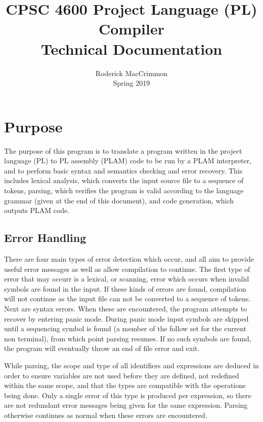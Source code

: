 \documentclass{article}
\begin{document}
\title{CPSC 4600 Project Language (PL) Compiler \\ \LARGE Technical Documentation}
\author{Roderick MacCrimmon \\ Spring 2019}
\date{}
\maketitle

\section{Purpose}

The purpose of this program is to translate a program written in the project language (PL) to PL assembly (PLAM) code to be run by a PLAM interpreter, and to perform basic syntax and semantics checking and error recovery. This includes lexical analysis, which converts the input source file to a sequence of tokens, parsing, which verifies the program is valid according to the language grammar (given at the end of this document), and code generation, which outputs PLAM code. 

\subsection{Error Handling}

There are four main types of error detection which occur, and all aim to provide useful error messages as well as allow compilation to continue. The first type of error that may occurr is a lexical, or scanning, error which occurs when invalid symbols are found in the input. If these kinds of errors are found, compilation will not continue as the input file can not be converted to a sequence of tokens. Next are syntax errors. When these are encountered, the program attempts to recover by entering panic mode. During panic mode input symbols are skipped until a sequencing symbol is found (a member of the follow set for the current non terminal), from which point parsing resumes. If no such symbols are found, the program will eventually throw an end of file error and exit. 

While parsing, the scope and type of all identifiers and expressions are deduced in order to ensure variables are not used before they are defined, not redefined within the same scope, and that the types are compatible with the operations being done. Only a single error of this type is produced per expression, so there are not redundant error messages being given for the same expression. Parsing otherwise continues as normal when these errors are encountered.
\end{document}
